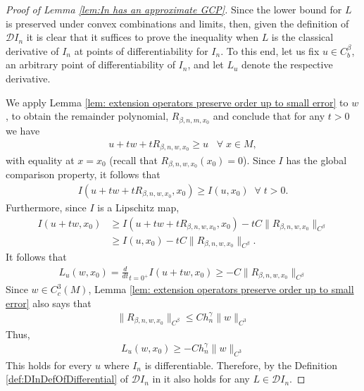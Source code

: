 \documentclass[11pt,reqno]{amsart}
\numberwithin{equation}{section}
\theoremstyle{plain}
\def\D{\mathcal D}
\def\gam{\gamma}
\begin{document}
\begin{proof}[Proof of Lemma \ref{lem:In has an approximate GCP}]
  Since the lower bound for $L$ is preserved under convex combinations and limits, then, given the definition of $\mathcal{D}I_n$ it is clear that it suffices to prove the inequality when $L$ is the classical derivative of $I_n$ at points of differentiability for $I_n$. To this end, let us fix $u \in C^\beta_b$, an arbitrary point of differentiability of $I_n$, and let $L_u$ denote the respective derivative. 
  
  We apply Lemma \ref{lem: extension operators preserve order up to small error} to $w$, to obtain the remainder polynomial, $R_{\beta,n,m,x_0}$ and conclude that for any $t>0$ we have
  \begin{align*}
    u+tw+tR_{\beta,n,w,x_0} \geq u\;\;\; \forall\;x \in M,
  \end{align*}	  
  with equality at $x=x_0$ (recall that $R_{\beta,n,w,x_0}(x_0)=0$). Since $I$ has the global comparison property, it follows that
  \begin{align*}
     I(u+tw+tR_{\beta, n,w,x_0},x_0) \geq I(u,x_0)\;\;\forall\;t>0.
  \end{align*}
  Furthermore, since $I$ is a Lipschitz map,
  \begin{align*}
    I(u+tw,x_0) & \geq I(u+tw+tR_{\beta,n,w,x_0},x_0)-tC\|R_{\beta,n,w,x_0}\|_{C^\beta}\\
	    & \geq I(u,x_0)-tC\|R_{\beta,n,w,x_0}\|_{C^\beta}.	  
  \end{align*}	
  It follows that     
  \begin{align*}
    L_u(w,x_0) = \frac{d}{dt}_{t=0^+}I(u+tw,x_0) \geq -C \|R_{\beta,n,w,x_0}\|_{C^\beta}  
  \end{align*}	  
  Since $w \in C^3_c(M)$, Lemma \ref{lem: extension operators preserve order up to small error} also says that
  \begin{align*}
    \|R_{\beta,n,w,x_0}\|_{C^\beta} \leq C h_n^\gam \|w\|_{C^3}
  \end{align*}
  Thus,
  \begin{align*}
    L_u(w,x_0) \geq -C h_n^\gam \|w\|_{C^3}  
  \end{align*}	  
  This holds for every $u$ where $I_n$ is differentiable. Therefore, by the Definition \ref{def:DInDefOfDifferential} of $\D I_n$ in  it also holds for any $L \in \mathcal{D}I_n$.
\end{proof}
\end{document}
